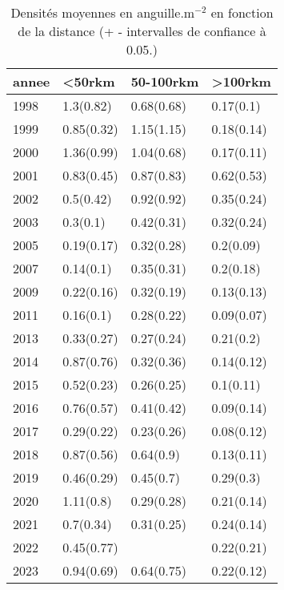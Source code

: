 \begin{table}[htbp]
\centering
\caption[Densité et distance.]{Densités moyennes en anguille.m$^{-2}$ en fonction de la distance (+ - intervalles de confiance à 0.05.)} 
\label{tableau3_dens_dist_annee}
\begin{tabular}{llll}
  \hline
annee & <50rkm & 50-100rkm & >100rkm \\ 
  \hline
1998 & 1.3(0.82) & 0.68(0.68) & 0.17(0.1) \\ 
  1999 & 0.85(0.32) & 1.15(1.15) & 0.18(0.14) \\ 
  2000 & 1.36(0.99) & 1.04(0.68) & 0.17(0.11) \\ 
  2001 & 0.83(0.45) & 0.87(0.83) & 0.62(0.53) \\ 
  2002 & 0.5(0.42) & 0.92(0.92) & 0.35(0.24) \\ 
  2003 & 0.3(0.1) & 0.42(0.31) & 0.32(0.24) \\ 
  2005 & 0.19(0.17) & 0.32(0.28) & 0.2(0.09) \\ 
  2007 & 0.14(0.1) & 0.35(0.31) & 0.2(0.18) \\ 
  2009 & 0.22(0.16) & 0.32(0.19) & 0.13(0.13) \\ 
  2011 & 0.16(0.1) & 0.28(0.22) & 0.09(0.07) \\ 
  2013 & 0.33(0.27) & 0.27(0.24) & 0.21(0.2) \\ 
  2014 & 0.87(0.76) & 0.32(0.36) & 0.14(0.12) \\ 
  2015 & 0.52(0.23) & 0.26(0.25) & 0.1(0.11) \\ 
  2016 & 0.76(0.57) & 0.41(0.42) & 0.09(0.14) \\ 
  2017 & 0.29(0.22) & 0.23(0.26) & 0.08(0.12) \\ 
  2018 & 0.87(0.56) & 0.64(0.9) & 0.13(0.11) \\ 
  2019 & 0.46(0.29) & 0.45(0.7) & 0.29(0.3) \\ 
  2020 & 1.11(0.8) & 0.29(0.28) & 0.21(0.14) \\ 
  2021 & 0.7(0.34) & 0.31(0.25) & 0.24(0.14) \\ 
  2022 & 0.45(0.77) &  & 0.22(0.21) \\ 
  2023 & 0.94(0.69) & 0.64(0.75) & 0.22(0.12) \\ 
   \hline
\end{tabular}
\end{table}
